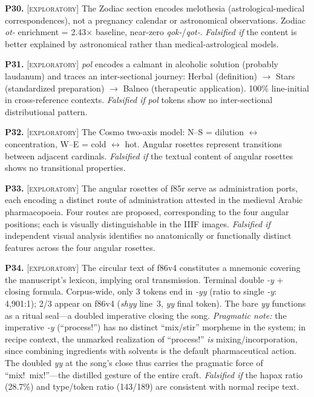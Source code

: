 \documentclass[11pt,a4paper]{article}
\newcommand{\exploratory}{\textsc{[exploratory]}}
\newcommand{\falsmark}{\textit{Falsified if}}
\begin{document}
\medskip

\noindent\textbf{P30.} \exploratory{} The Zodiac section encodes melothesia (astrological-medical correspondences), not a pregnancy calendar or astronomical observations. Zodiac \textit{ot-} enrichment = 2.43$\times$ baseline, near-zero \textit{qok-}/\textit{qot-}. \falsmark{} the content is better explained by astronomical rather than medical-astrological models.

\medskip

\noindent\textbf{P31.} \exploratory{} \textit{pol} encodes a calmant in alcoholic solution (probably laudanum) and traces an inter-sectional journey: Herbal (definition) $\rightarrow$ Stars (standardized preparation) $\rightarrow$ Balneo (therapeutic application). 100\% line-initial in cross-reference contexts. \falsmark{} \textit{pol} tokens show no inter-sectional distributional pattern.

\medskip

\noindent\textbf{P32.} \exploratory{} The Cosmo two-axis model: N--S = dilution $\leftrightarrow$ concentration, W--E = cold $\leftrightarrow$ hot. Angular rosettes represent transitions between adjacent cardinals. \falsmark{} the textual content of angular rosettes shows no transitional properties.

\medskip

\noindent\textbf{P33.} \exploratory{} The angular rosettes of f85r serve as administration ports, each encoding a distinct route of administration attested in the medieval Arabic pharmacopoeia. Four routes are proposed, corresponding to the four angular positions; each is visually distinguishable in the IIIF images. \falsmark{} independent visual analysis identifies no anatomically or functionally distinct features across the four angular rosettes.

\medskip

\noindent\textbf{P34.} \exploratory{} The circular text of f86v4 constitutes a mnemonic covering the manuscript's lexicon, implying oral transmission. Terminal double \textit{-y} + closing formula. Corpus-wide, only 3 tokens end in \textit{-yy} (ratio to single \textit{-y}: 4,901:1); 2/3 appear on f86v4 (\textit{shyy} line~3, \textit{yy} final token). The bare \textit{yy} functions as a ritual seal---a doubled imperative closing the song. \textit{Pragmatic note:} the imperative \textit{-y} (``process!'') has no distinct ``mix/stir'' morpheme in the system; in recipe context, the unmarked realization of ``process!'' \textit{is} mixing/incorporation, since combining ingredients with solvents is the default pharmaceutical action. The doubled \textit{yy} at the song's close thus carries the pragmatic force of ``mix!\ mix!''---the distilled gesture of the entire craft. \falsmark{} the hapax ratio (28.7\%) and type/token ratio (143/189) are consistent with normal recipe text.
\end{document}
